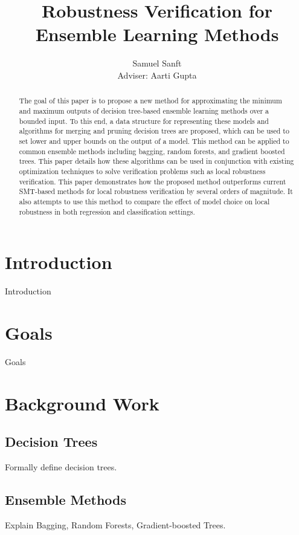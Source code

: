 \documentclass[pageno]{jpaper}
\begin{document}
\title{
Robustness Verification for Ensemble Learning Methods
}
\author{Samuel Sanft\\Adviser: Aarti Gupta}
\date{}
\maketitle

\begin{doublespacing}

\begin{abstract}
The goal of this paper is to propose a new method for approximating the minimum and maximum outputs of decision tree-based ensemble learning methods over a bounded input. To this end, a data structure for representing these models and algorithms for merging and pruning decision trees are proposed, which can be used to set lower and upper bounds on the output of a model. This method can be applied to common ensemble methods including bagging, random forests, and gradient boosted trees. This paper details how these algorithms can be used in conjunction with existing optimization techniques to solve verification problems such as local robustness verification. This paper demonstrates how the proposed method outperforms current SMT-based methods for local robustness verification by several orders of magnitude. It also attempts to use this method to compare the effect of model choice on local robustness in both regression and classification settings.
\end{abstract}

\section{Introduction}
Introduction

\section{Goals}
Goals

\section{Background Work}
\subsection{Decision Trees}
Formally define decision trees.

\subsection{Ensemble Methods}
Explain Bagging, Random Forests, Gradient-boosted Trees.


\end{doublespacing}
\end{document}
